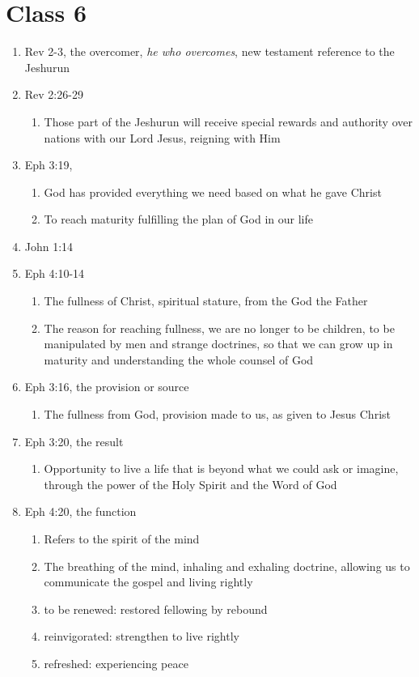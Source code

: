 \documentclass[11pt]{article}
\begin{document}
\section*{Class 6}
\begin{enumerate}
	\item Rev 2-3, the overcomer, \emph{he who overcomes}, new testament reference to the Jeshurun
	\item Rev 2:26-29
	\begin{enumerate}
		\item Those part of the Jeshurun will receive special rewards and authority over nations with our Lord Jesus, reigning with Him
	\end{enumerate}
	\item Eph 3:19,
	\begin{enumerate}
		\item God has provided everything we need based on what he gave Christ
		\item To reach maturity fulfilling the plan of God in our life 
	\end{enumerate}
	\item John 1:14
	\item Eph 4:10-14
	\begin{enumerate}
		\item The fullness of Christ, spiritual stature, from the God the Father
		\item The reason for reaching fullness, we are no longer to be children, to be manipulated by men and strange doctrines, so that we can grow up in maturity and understanding the whole counsel of God
	\end{enumerate}
	\item Eph 3:16, the provision or source
	\begin{enumerate}
		\item The fullness from God, provision made to us, as given to Jesus Christ
	\end{enumerate}
	\item Eph 3:20, the result
	\begin{enumerate}
		\item Opportunity to live a life that is beyond what we could ask or imagine, through the power of the Holy Spirit and the Word of God
	\end{enumerate}
	\item Eph 4:20, the function
	\begin{enumerate}
		\item Refers to the spirit of the mind
		\item The breathing of the mind, inhaling and exhaling doctrine, allowing us to communicate the gospel and living rightly
		\item to be renewed: restored fellowing by rebound 
		\item reinvigorated: strengthen to live rightly
		\item refreshed: experiencing peace 
	\end{enumerate}


\end{enumerate}
\end{document}
